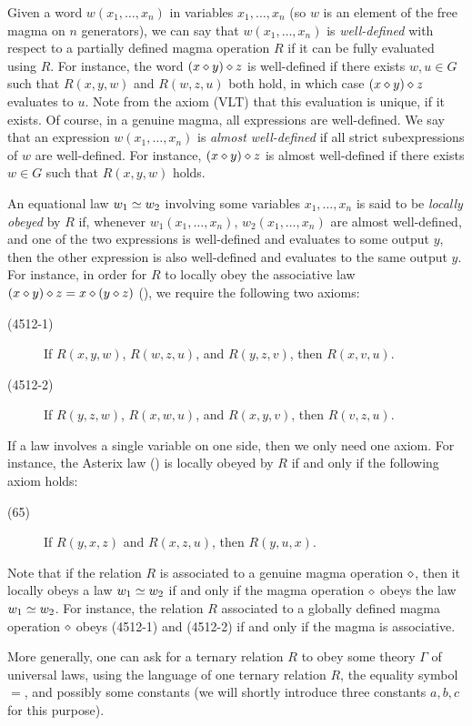 Given a word $w(x_1,\dots,x_n)$ in variables $x_1,\dots,x_n$ (so $w$ is an element of the free magma on $n$ generators), we can say that $w(x_1,\dots,x_n)$ is \emph{well-defined} with respect to a partially defined magma operation $R$ if it can be fully evaluated using $R$.  For instance, the word $(x \diamond y) \diamond z$ is well-defined if there exists $w,u \in G$ such that $R(x,y,w)$ and $R(w,z,u)$ both hold, in which case $(x \diamond y) \diamond z$ evaluates to $u$.  Note from the axiom (VLT) that this evaluation is unique, if it exists.  Of course, in a genuine magma, all expressions are well-defined.  We say that an expression $w(x_1,\dots,x_n)$ is \emph{almost well-defined} if all strict subexpressions of $w$ are well-defined.  For instance, $(x \diamond y) \diamond z$ is almost well-defined if there exists $w \in G$ such that $R(x,y,w)$ holds.

An equational law $w_1 \simeq w_2$ involving some variables $x_1,\dots,x_n$ is said to be \emph{locally obeyed} by $R$ if,  whenever $w_1(x_1,\dots,x_n)$, $w_2(x_1,\dots,x_n)$ are almost well-defined, and one of the two expressions is well-defined and evaluates to some output $y$, then the other expression is also well-defined and evaluates to the same output $y$.  For instance, in order for $R$ to locally obey the associative law $(x \diamond y) \diamond z = x \diamond (y \diamond z)$ (), we require the following two axioms:
\begin{description}
  \item[(4512-1)] If $R(x,y,w)$, $R(w,z,u)$, and $R(y,z,v)$, then $R(x,v,u)$.
  \item[(4512-2)] If $R(y,z,w)$, $R(x,w,u)$, and $R(x,y,v)$, then $R(v,z,u)$.
\end{description}
If a law involves a single variable on one side, then we only need one axiom.  For instance, the Asterix law () is locally obeyed by $R$ if and only if the following axiom holds:
\begin{description}
  \item[(65)] If $R(y,x,z)$ and $R(x,z,u)$, then $R(y,u,x)$.
\end{description}
Note that if the relation $R$ is associated to a genuine magma operation $\diamond$, then it locally obeys a law $w_1 \simeq w_2$ if and only if the magma operation $\diamond$ obeys the law $w_1 \simeq w_2$.  For instance, the relation $R$ associated to a globally defined magma operation $\diamond$ obeys (4512-1) and (4512-2) if and only if the magma is associative.

More generally, one can ask for a ternary relation $R$ to obey some theory $\Gamma$ of universal laws, using the language of one ternary relation $R$, the equality symbol $=$, and possibly some constants (we will shortly introduce three constants $a,b,c$ for this purpose).

